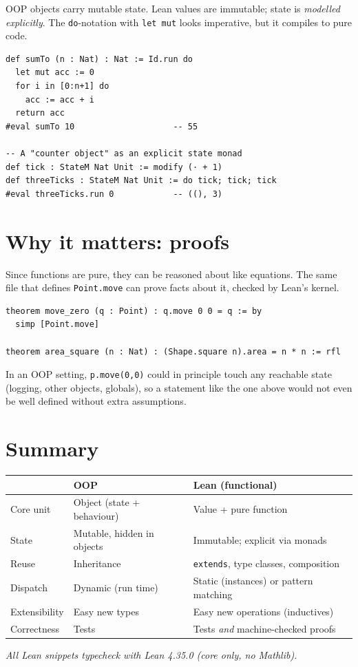\documentclass[11pt,a4paper]{article}
\newcommand{\lean}[1]{\lstinline[language=Lean]{#1}}
\begin{document}
OOP objects carry mutable state. Lean values are immutable; state is
\emph{modelled explicitly}. The \lean{do}-notation with \lean{let mut}
looks imperative, but it compiles to pure code.

\begin{lstlisting}[language=Lean]
def sumTo (n : Nat) : Nat := Id.run do
  let mut acc := 0
  for i in [0:n+1] do
    acc := acc + i
  return acc
#eval sumTo 10                    -- 55

-- A "counter object" as an explicit state monad
def tick : StateM Nat Unit := modify (· + 1)
def threeTicks : StateM Nat Unit := do tick; tick; tick
#eval threeTicks.run 0            -- ((), 3)
\end{lstlisting}

\section{Why it matters: proofs}

Since functions are pure, they can be reasoned about like equations. The
same file that defines \lean{Point.move} can prove facts about it, checked
by Lean's kernel.

\begin{lstlisting}[language=Lean]
theorem move_zero (q : Point) : q.move 0 0 = q := by
  simp [Point.move]

theorem area_square (n : Nat) : (Shape.square n).area = n * n := rfl
\end{lstlisting}

In an OOP setting, \texttt{p.move(0,0)} could in principle touch any
reachable state (logging, other objects, globals), so a statement like the
one above would not even be well defined without extra assumptions.

\section{Summary}

\begin{center}
\begin{tabularx}{\linewidth}{@{}lXX@{}}
\toprule
 & \textbf{OOP} & \textbf{Lean (functional)} \\
\midrule
Core unit      & Object (state + behaviour) & Value + pure function \\
State          & Mutable, hidden in objects & Immutable; explicit via monads \\
Reuse          & Inheritance                & \lean{extends}, type classes, composition \\
Dispatch       & Dynamic (run time)         & Static (instances) or pattern matching \\
Extensibility  & Easy new types             & Easy new operations (inductives) \\
Correctness    & Tests                      & Tests \emph{and} machine-checked proofs \\
\bottomrule
\end{tabularx}
\end{center}

\vfill
\small\textit{All Lean snippets typecheck with Lean 4.35.0 (core only, no Mathlib).}
\end{document}

